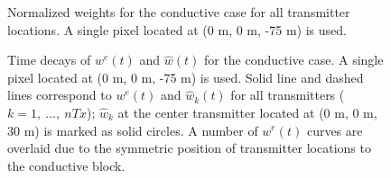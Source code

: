 \documentclass[extra,mreferee]{gji}
\begin{document}
\begin{figure}
  \caption{Normalized weights for the conductive case for all transmitter locations. A single pixel located at (0 m, 0 m, -75 m) is used. }
  \label{F:NormalizedWeights}
\end{figure}

\begin{figure}
  \caption{Time decays of $w^e(t)$ and $\hat{w}(t)$ for the conductive case. A single pixel located at (0 m, 0 m, -75 m) is used. Solid line and dashed lines correspond to $w^e(t)$ and $\hat{w}_k(t)$ for all transmitters ($k=1,\ \ldots,\ nTx$); $\hat{w}_k$ at the center transmitter located at (0 m, 0 m, 30 m) is marked as solid circles. A number of $w^e(t)$ curves are overlaid due to the symmetric position of transmitter locations to the conductive block. }
  \label{F:AveragedWe}
\end{figure}
\clearpage
\end{document}

